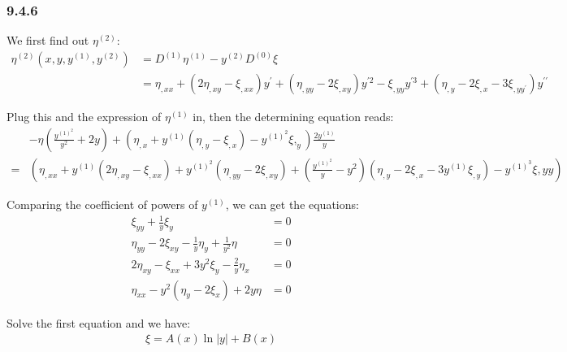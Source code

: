 \documentclass[]{ctexart}
\begin{document}
\subsubsection*{9.4.6}
	We first find out $\eta^{(2)}$:
		\begin{equation*}
		\begin{aligned}
			\eta^{(2)}\left(x, y, y^{(1)}, y^{(2)}\right)&=D^{(1)} \eta^{(1)}-y^{(2)} D^{(0)} \xi\\
			&=\eta_{,x x}+\left(2 \eta_{,x y}-\xi_{,x x}\right) y^{\prime}+\left(\eta_{,y y}-2 \xi_{,x y}\right) y^{\prime 2}-\xi_{,y y} y^{\prime 3}+\left(\eta_{,y}-2 \xi_{,x}-3 \xi_{,y y^{\prime}}\right) y^{\prime \prime}
		\end{aligned}
		\end{equation*}
		
	Plug this and the expression of $\eta^{(1)}$ in, then the determining equation reads:
		\begin{equation*}
		\begin{aligned}
			&-\eta\left(\frac{y^{(1)^{2}}}{y^{2}}+2 y\right)+\left(\eta_{, x}+y^{(1)}\left(\eta_{, y}-\xi_{, x}\right)-y^{(1)^{2}} \xi,_{y}\right) \frac{2 y^{(1)}}{y}\\
			=&\left(\eta_{, x x}+y^{(1)}\left(2 \eta_{, x y}-\xi_{, x x}\right)+y^{(1)^{2}}\left(\eta_{, y y}-2 \xi_{, x y}\right)+\left(\frac{y^{(1)^{2}}}{y}-y^{2}\right)\left(\eta_{, y}-2 \xi_{, x}-3 y^{(1)} \xi_{, y}\right)-y^{(1)^{3}} \xi, y y\right)
		\end{aligned}
		\end{equation*}
		
	Comparing the coefficient of powers of $y^{(1)}$, we can get the equations:
		\begin{equation*}
			\begin{aligned}
			\xi_{y y}+\frac{1}{y} \xi_{y} &=0 \\
			\eta_{y y}-2 \xi_{x y}-\frac{1}{y} \eta_{y}+\frac{1}{y^{2}} \eta &=0 \\
			2 \eta_{x y}-\xi_{x x}+3 y^{2} \xi_{y}-\frac{2}{y} \eta_{x} &=0 \\
			\eta_{x x}-y^{2}\left(\eta_{y}-2 \xi_{x}\right)+2 y \eta &=0
			\end{aligned}
		\end{equation*}
		
	Solve the first equation and we have:
		\begin{equation*}
		\begin{aligned}
			\xi=A(x) \ln |y|+B(x)
		\end{aligned}
		\end{equation*}
	
\end{document}
